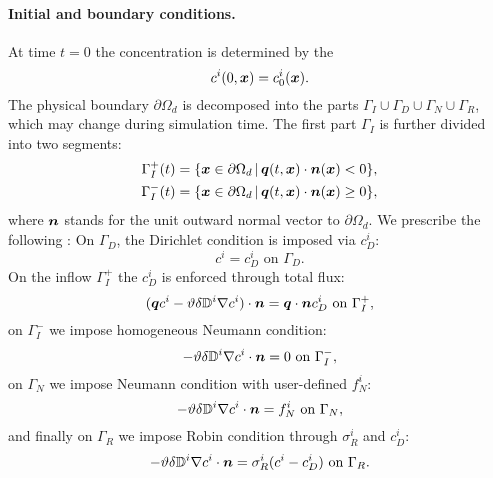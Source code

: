 \paragraph{Initial and boundary conditions.}
At time $t=0$ the concentration is determined by the 
$$ c^i(0,\mathbf{\boldsymbol{x}}) = c^i_0(\mathbf{\boldsymbol{x}}). $$
The physical boundary $\partial\Omega_d$ is decomposed into the parts $\Gamma_I\cup\Gamma_D\cup\Gamma_N\cup\Gamma_R$, which may change during simulation time.
The first part $\Gamma_I$ is further divided into two segments:
\begin{align*}
\Gamma_I^+(t) &= \{\mathbf{\boldsymbol{x}}\in \partial\Omega_d\,|\, \mathbf{\boldsymbol{q}}(t,\mathbf{\boldsymbol{x}})\cdot\mathbf{\boldsymbol{n}}(\mathbf{\boldsymbol{x}})<0\},\\
\Gamma_I^-(t) &= \{\mathbf{\boldsymbol{x}}\in \partial\Omega_d\,|\, \mathbf{\boldsymbol{q}}(t,\mathbf{\boldsymbol{x}})\cdot\mathbf{\boldsymbol{n}}(\mathbf{\boldsymbol{x}})\ge 0\},
\end{align*}
where $\mathbf{\boldsymbol{n}}$ stands for the unit outward normal vector to $\partial\Omega_d$.
We prescribe the following :
On $\Gamma_D$, the Dirichlet condition is imposed via  $c_D^i$:
$$ c^i = c^i_D \mbox{ on }\Gamma_D. $$
On the inflow $\Gamma_I^+$ the  $c_D^i$ is enforced through total flux:
$$ (\mathbf{\boldsymbol{q}} c^i - \vartheta\delta{{\mathbb{D}}}^i\nabla c^i)\cdot\mathbf{\boldsymbol{n}} = \mathbf{\boldsymbol{q}}\cdot\mathbf{\boldsymbol{n}} c_D^i \mbox{ on }\Gamma_I^+, $$
on $\Gamma_I^-$ we impose homogeneous Neumann condition:
$$ -\vartheta\delta{{\mathbb{D}}}^i\nabla c^i\cdot\mathbf{\boldsymbol{n}} = 0 \mbox{ on }\Gamma_I^-, $$
on $\Gamma_N$ we impose Neumann condition with user-defined  $f^i_N$:
$$ -\vartheta\delta{{\mathbb{D}}}^i\nabla c^i\cdot\mathbf{\boldsymbol{n}} = f^i_N \mbox{ on }\Gamma_N, $$
and finally on $\Gamma_R$ we impose Robin condition through  $\sigma^i_R$ and  $c^i_D$:
$$ -\vartheta\delta{{\mathbb{D}}}^i\nabla c^i\cdot\mathbf{\boldsymbol{n}} = \sigma^i_R(c^i-c^i_D) \mbox{ on }\Gamma_R. $$






